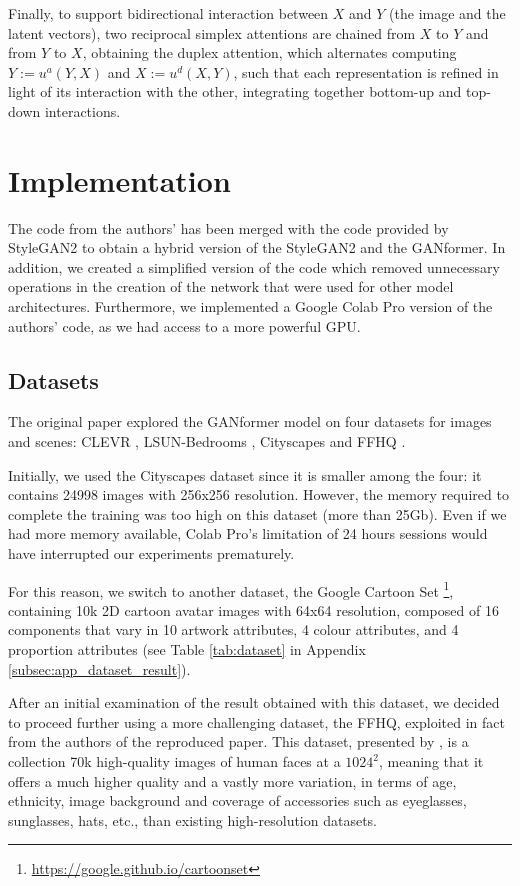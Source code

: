 \documentclass{article}
\begin{document}
Finally, to support bidirectional interaction between $X$ and $Y$ (the image and the latent vectors), 
two 
reciprocal simplex attentions are chained from $X$ to $Y$ and from $Y$ to $X$, obtaining the 
duplex 
attention, which alternates computing $Y :=u^a(Y,X)$ and $X:=u^d(X,Y)$, such that each 
representation is refined in light of its interaction with the other, integrating together bottom-up and 
top-down interactions.

\section{Implementation}
The code from the authors' has been merged with the code provided by StyleGAN2 to obtain a 
hybrid version of the StyleGAN2 and the GANformer. In addition, we created a simplified version of the code which removed unnecessary operations in the creation of the network that were used for other model architectures. Furthermore, we implemented a Google Colab Pro version of the authors’ code, as we had access to a more powerful GPU.

\subsection{Datasets}	\label{sec:dataset}
The original paper \cite{hudson2021generative} explored the GANformer model on four datasets for 
images and scenes: CLEVR \cite{johnson2017clevr}, LSUN-Bedrooms \cite{yu2015lsun}, Cityscapes 
\cite{cordts2016cityscapes} and FFHQ \cite{karras2019style}. 

Initially, we used the Cityscapes dataset since it is smaller among the four: it contains 
24998 images with 256x256 resolution. 
However, the memory required to complete the training was too high on this dataset (more than 
25Gb).
Even if we had more memory available, Colab Pro's limitation of 24 hours sessions would have 
interrupted our experiments prematurely.

For this reason, we switch to another dataset, the Google Cartoon Set \cite{cartoonset}\footnote{	
	\url{https://google.github.io/cartoonset}}, containing 10k 2D cartoon avatar 
images with 64x64 resolution, composed of 16 components that vary in 10 artwork attributes, 4 
colour attributes, and 4 proportion attributes (see Table \ref{tab:dataset} in Appendix 
\ref{subsec:app_dataset_result}). 

After an initial examination of the result obtained with this dataset, we decided to proceed further using a more challenging dataset, the FFHQ, exploited in fact from the authors of the reproduced paper. 
This dataset, presented by \citet{karras2019style}, is a collection 70k high-quality images of human faces at a $1024^2$, meaning that it offers a much higher quality and a vastly more variation, in terms of age, ethnicity, image background and coverage of accessories such as eyeglasses, sunglasses, hats, etc., than existing high-resolution datasets.
\end{document}
